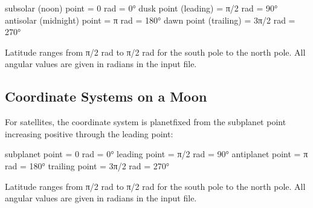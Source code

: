 \documentclass[letterpaper,10pt,english]{sphinxmanual}
\begin{document}
\begin{sphinxVerbatim}[commandchars=\\\{\}]
sub\PYGZhy{}solar (noon) point = 0 rad = 0°
dusk point (leading) = π/2 rad = 90°
anti\PYGZhy{}solar (midnight) point = π rad = 180°
dawn point (trailing) = 3π/2 rad = 270°
\end{sphinxVerbatim}

\sphinxAtStartPar
Latitude ranges from \sphinxhyphen{}π/2 rad to π/2 rad for the south pole to the north pole.
All angular values are given in radians in the input file.


\subsection{Coordinate Systems on a Moon}
\label{\detokenize{nexoclom2/coordinate_systems:coordinate-systems-on-a-moon}}
\sphinxAtStartPar
For satellites, the coordinate system is planet\sphinxhyphen{}fixed from the sub\sphinxhyphen{}planet
point increasing positive through the leading point:

\begin{sphinxVerbatim}[commandchars=\\\{\}]
sub\PYGZhy{}planet point = 0 rad = 0°
leading point = π/2 rad = 90°
anti\PYGZhy{}planet point = π rad = 180°
trailing point = 3π/2 rad = 270°
\end{sphinxVerbatim}

\sphinxAtStartPar
Latitude ranges from \sphinxhyphen{}π/2 rad to π/2 rad for the south pole to the north pole.
All angular values are given in radians in the input file.

\sphinxstepscope
\end{document}
